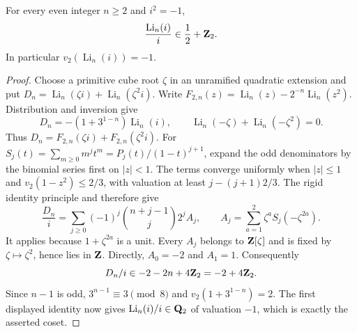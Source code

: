 \begin{lemma}
\label{d3:lem:evenweightibase}
For every even integer $n\geq2$ and $i^2=-1$,
\[
 \frac{\operatorname{Li}_n(i)}{i}\in\frac12+\mathbf Z_2.
\]
In particular $v_2(\operatorname{Li}_n(i))=-1$.
\end{lemma}
\begin{proof}
Choose a primitive cube root $\zeta$ in an unramified quadratic
extension and put
$D_n=\operatorname{Li}_n(\zeta i)+\operatorname{Li}_n(\zeta^2i)$.
Write $F_{2,n}(z)=\operatorname{Li}_n(z)-2^{-n}\operatorname{Li}_n(z^2)$.
Distribution and inversion give
\[
 D_n=-(1+3^{1-n})\operatorname{Li}_n(i),\qquad
 \operatorname{Li}_n(-\zeta)+\operatorname{Li}_n(-\zeta^2)=0.
\]
Thus $D_n=F_{2,n}(\zeta i)+F_{2,n}(\zeta^2i)$.
For $S_j(t)=\sum_{m\geq0}m^jt^m
=P_j(t)/(1-t)^{j+1}$, expand the odd denominators by the binomial
series first on $|z|<1$. The terms converge uniformly when
$|z|\leq1$ and $v_2(1-z^2)\leq2/3$, with valuation at least
$j-(j+1)2/3$. The rigid identity principle and
\cite[Theorem~2.7(3)]{BesserDeJeuAlgorithm} therefore give
\[
 \frac{D_n}{i}
 =\sum_{j\geq0}(-1)^j\binom{n+j-1}{j}2^j A_j,
 \qquad A_j=\sum_{a=1}^2\zeta^a S_j(-\zeta^{2a}).
\]
It applies because $1+\zeta^{2a}$ is a unit.
Every $A_j$ belongs to $\mathbf Z[\zeta]$ and is fixed by
$\zeta\mapsto\zeta^2$, hence lies in $\mathbf Z$.
Directly, $A_0=-2$ and $A_1=1$.
Consequently
\[
 D_n/i\in-2-2n+4\mathbf Z_2=-2+4\mathbf Z_2.
\]
Since $n-1$ is odd, $3^{n-1}\equiv3\pmod8$ and
$v_2(1+3^{1-n})=2$.
The first displayed identity now gives
$\operatorname{Li}_n(i)/i\in\mathbf Q_2$ of valuation $-1$,
which is exactly the asserted coset.
\end{proof}

